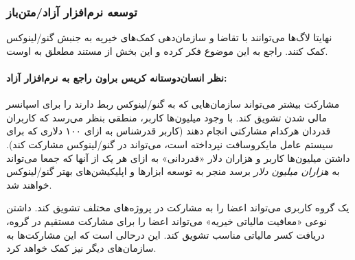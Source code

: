 \subsubsection{توسعه نرم‌افزار آزاد/متن‌باز}

نهایتا لاگ‌ها می‌توانند با تقاضا و سازمان‌دهی کمک‌های خیریه
به جنبش گنو/لینوکس کمک کنند.
راجع به این موضوع فکر کرده و این بخش از مستند مطعلق به اوست.

\paragraph{نظر انسان‌دوستانه کریس براون راجع به نرم‌افزار آزاد:}


مشارکت بیشتر می‌تواند سازمان‌هایی که به گنو/لینوکس ربط دارند را
برای اسپانسر مالی شدن تشویق کند. با وجود میلیون‌ها کاربر، منطقی
بنظر می‌رسد که کاربران قدردان هرکدام مشارکتی انجام دهند
(کاربر قدرشناس به ازای ۱۰۰ دلاری که برای سیستم عامل مایکروسافت
نپرداخته است، می‌تواند در گنو/لینوکس مشارکت کند).
داشتن میلیون‌ها کاربر و هزاران دلار «قدردانی» به ازای هر یک از آنها
که جمعا می‌تواند به
{\itshape هزاران میلیون دلار}
برسد منجر به توسعه ابزار‌ها و اپلیکیشن‌های بهتر گنو/لینوکس خواهند شد.


یک گروه کاربری می‌تواند اعضا را به مشارکت در پروژه‌های مختلف تشویق کند.
داشتن نوعی «معافیت مالیاتی خیریه» می‌تواند اعضا را برای مشارکت مستقیم در گروه،
دریافت کسر مالیاتی مناسب تشویق کند. این درحالی است که این مشارکت‌ها
به سازمان‌های دیگر نیز کمک خواهد کرد.

